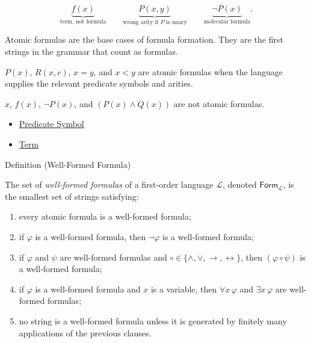 \begin{remark*}
\[
\underbrace{f(x)}_{\text{term, not formula}}
\qquad
\underbrace{P(x,y)}_{\text{wrong arity if }P\text{ is unary}}
\qquad
\underbrace{\neg P(x)}_{\text{molecular formula}}.
\]
\end{remark*}

\begin{remark*}[Interpretation]
Atomic formulas are the base cases of formula formation. They are the first
strings in the grammar that count as formulas.
\end{remark*}

\begin{remark*}[Examples]
\(P(x)\), \(R(x,c)\), \(x=y\), and \(x<y\) are atomic formulas when the
language supplies the relevant predicate symbols and arities.
\end{remark*}

\begin{remark*}
\(x\), \(f(x)\), \(\neg P(x)\), and \((P(x)\land Q(x))\) are not atomic
formulas.
\end{remark*}

\begin{dependencies}
\begin{itemize}
  \item \hyperref[def:predicate-symbol]{Predicate Symbol}
  \item \hyperref[def:term]{Term}
\end{itemize}
\end{dependencies}

\begin{definitionbox}{Definition (Well-Formed Formula)}
\begin{definition}
\label{def:wff-pred}
The set of \emph{well-formed formulas} of a first-order language
\(\mathcal L\), denoted \(\mathsf{Form}_{\mathcal L}\), is the smallest set of
strings satisfying:
\begin{enumerate}
\item every atomic formula is a well-formed formula;
\item if \(\varphi\) is a well-formed formula, then
      \(\neg\varphi\) is a well-formed formula;
\item if \(\varphi\) and \(\psi\) are well-formed formulas and
      \(\circ\in\{\land,\lor,\to,\leftrightarrow\}\), then
      \((\varphi\circ\psi)\) is a well-formed formula;
\item if \(\varphi\) is a well-formed formula and \(x\) is a variable, then
      \(\forall x\,\varphi\) and \(\exists x\,\varphi\) are well-formed
      formulas;
\item no string is a well-formed formula unless it is generated by finitely
      many applications of the previous clauses.
\end{enumerate}
\end{definition}
\end{definitionbox}

